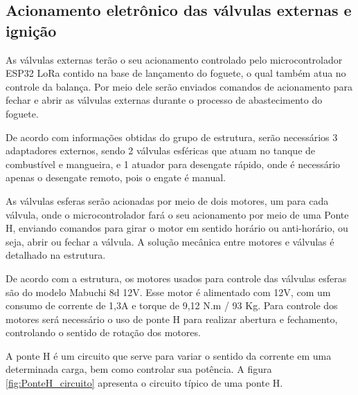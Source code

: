 \subsection{Acionamento eletrônico das válvulas externas e ignição}

\par As válvulas externas terão o seu acionamento controlado pelo microcontrolador ESP32 LoRa contido na base de lançamento do foguete, o qual também atua no controle da balança. Por meio dele serão enviados comandos de acionamento para fechar e abrir as válvulas externas durante o processo de abastecimento do foguete.

\par De acordo com informações obtidas do grupo de estrutura, serão necessários 3 adaptadores externos, sendo 2 válvulas esféricas que atuam no tanque de combustível e mangueira, e 1 atuador para desengate rápido, onde é necessário apenas o desengate remoto, pois o engate é manual. 

\par As válvulas esferas serão acionadas por meio de dois motores, um para cada válvula, onde o microcontrolador fará o seu acionamento por meio de uma Ponte H, enviando comandos para girar o motor em sentido horário ou anti-horário, ou seja, abrir ou fechar a válvula. A solução mecânica entre motores e válvulas é detalhado na estrutura.

\par De acordo com a estrutura, os motores usados para controle das válvulas esferas são do modelo Mabuchi 8d 12V. Esse motor é alimentado com 12V, com um consumo de corrente de 1,3A e torque de 9,12 N.m / 93 Kg. Para controle dos motores será necessário o uso de ponte H para realizar abertura e fechamento, controlando o sentido de rotação dos motores. 

\par A ponte H é um circuito que serve para variar o sentido da corrente em uma determinada carga, bem como controlar sua potência. A figura \ref{fig:PonteH_circuito} apresenta o circuito típico de uma ponte H.

